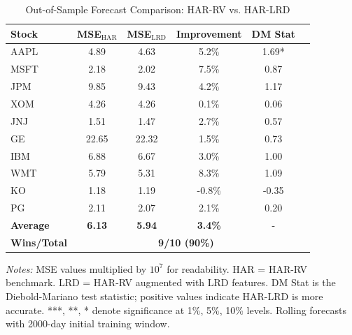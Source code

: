 \begin{table}[htbp]
\centering
\caption{Out-of-Sample Forecast Comparison: HAR-RV vs. HAR-LRD}
\label{tab:model_comparison}
\small
\begin{tabular}{lccccc}
\toprule
Stock & MSE$_{\text{HAR}}$ & MSE$_{\text{LRD}}$ & Improvement & DM Stat \\
\midrule
AAPL & 4.89 & 4.63 & 5.2\% & 1.69* \\
MSFT & 2.18 & 2.02 & 7.5\% & 0.87 \\
JPM & 9.85 & 9.43 & 4.2\% & 1.17 \\
XOM & 4.26 & 4.26 & 0.1\% & 0.06 \\
JNJ & 1.51 & 1.47 & 2.7\% & 0.57 \\
GE & 22.65 & 22.32 & 1.5\% & 0.73 \\
IBM & 6.88 & 6.67 & 3.0\% & 1.00 \\
WMT & 5.79 & 5.31 & 8.3\% & 1.09 \\
KO & 1.18 & 1.19 & -0.8\% & -0.35 \\
PG & 2.11 & 2.07 & 2.1\% & 0.20 \\
\midrule
\textbf{Average} & \textbf{6.13} & \textbf{5.94} & \textbf{3.4\%} & - \\
\textbf{Wins/Total} & \multicolumn{4}{c}{\textbf{9/10 (90\%)}} \\
\bottomrule
\end{tabular}
\begin{tablenotes}\small
\item \textit{Notes:} MSE values multiplied by $10^7$ for readability. HAR = HAR-RV benchmark. LRD = HAR-RV augmented with LRD features. DM Stat is the Diebold-Mariano test statistic; positive values indicate HAR-LRD is more accurate. ***, **, * denote significance at 1\%, 5\%, 10\% levels. Rolling forecasts with 2000-day initial training window.
\end{tablenotes}
\end{table}


